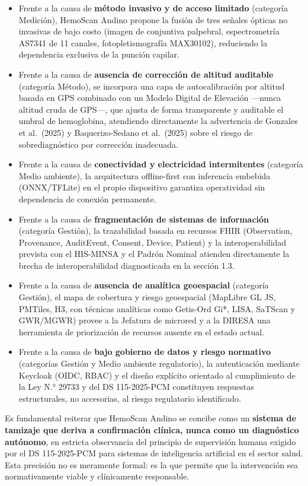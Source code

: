 \documentclass[11pt,a4paper]{article}
\providecommand{\tightlist}{%
  \setlength{\itemsep}{0pt}\setlength{\parskip}{0pt}}
\begin{document}
\begin{itemize}
\tightlist
\item
  Frente a la causa de \textbf{método invasivo y de acceso limitado} (categoría Medición), HemoScan Andino propone la fusión de tres señales ópticas no invasivas de bajo costo (imagen de conjuntiva palpebral, espectrometría AS7341 de 11 canales, fotopletismografía MAX30102), reduciendo la dependencia exclusiva de la punción capilar.
\item
  Frente a la causa de \textbf{ausencia de corrección de altitud auditable} (categoría Método), se incorpora una capa de autocalibración por altitud basada en GPS combinado con un Modelo Digital de Elevación ---nunca altitud cruda de GPS---, que ajusta de forma transparente y auditable el umbral de hemoglobina, atendiendo directamente la advertencia de Gonzales et al.~(2025) y Baquerizo-Sedano et al.~(2025) sobre el riesgo de sobrediagnóstico por corrección inadecuada.
\item
  Frente a la causa de \textbf{conectividad y electricidad intermitentes} (categoría Medio ambiente), la arquitectura offline-first con inferencia embebida (ONNX/TFLite) en el propio dispositivo garantiza operatividad sin dependencia de conexión permanente.
\item
  Frente a la causa de \textbf{fragmentación de sistemas de información} (categoría Gestión), la trazabilidad basada en recursos FHIR (Observation, Provenance, AuditEvent, Consent, Device, Patient) y la interoperabilidad prevista con el HIS-MINSA y el Padrón Nominal atienden directamente la brecha de interoperabilidad diagnosticada en la sección 1.3.
\item
  Frente a la causa de \textbf{ausencia de analítica geoespacial} (categoría Gestión), el mapa de cobertura y riesgo geoespacial (MapLibre GL JS, PMTiles, H3, con técnicas analíticas como Getis-Ord Gi*, LISA, SaTScan y GWR/MGWR) provee a la Jefatura de microred y a la DIRESA una herramienta de priorización de recursos ausente en el estado actual.
\item
  Frente a la causa de \textbf{bajo gobierno de datos y riesgo normativo} (categorías Gestión y Medio ambiente regulatorio), la autenticación mediante Keycloak (OIDC, RBAC) y el diseño explícito orientado al cumplimiento de la Ley N.° 29733 y del DS 115-2025-PCM constituyen respuestas estructurales, no accesorias, al riesgo regulatorio identificado.
\end{itemize}

Es fundamental reiterar que HemoScan Andino se concibe como un \textbf{sistema de tamizaje que deriva a confirmación clínica, nunca como un diagnóstico autónomo}, en estricta observancia del principio de supervisión humana exigido por el DS 115-2025-PCM para sistemas de inteligencia artificial en el sector salud. Esta precisión no es meramente formal: es la que permite que la intervención sea normativamente viable y clínicamente responsable.
\end{document}
